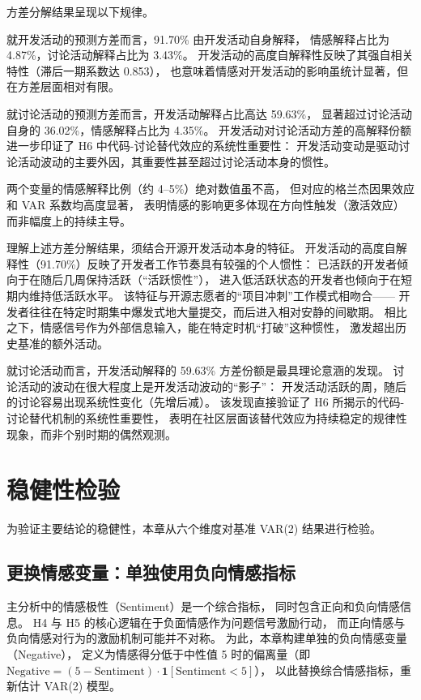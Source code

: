 \documentclass[
    type = master, %
    degree = professional,        %
    decl-page,  %
    twoside,                %
    fontset = fandol %
  ]{njuthesis}
\begin{document}
方差分解结果呈现以下规律。

就开发活动的预测方差而言，91.70\% 由开发活动自身解释，
情感解释占比为 4.87\%，讨论活动解释占比为 3.43\%。
开发活动的高度自解释性反映了其强自相关特性（滞后一期系数达 0.853），
也意味着情感对开发活动的影响虽统计显著，但在方差层面相对有限。

就讨论活动的预测方差而言，开发活动解释占比高达 59.63\%，
显著超过讨论活动自身的 36.02\%，情感解释占比为 4.35\%。
开发活动对讨论活动方差的高解释份额进一步印证了 H6 中代码-讨论替代效应的系统性重要性：
开发活动变动是驱动讨论活动波动的主要外因，其重要性甚至超过讨论活动本身的惯性。

两个变量的情感解释比例（约 4--5\%）绝对数值虽不高，
但对应的格兰杰因果效应和 VAR 系数均高度显著，
表明情感的影响更多体现在方向性触发（激活效应）而非幅度上的持续主导。

理解上述方差分解结果，须结合开源开发活动本身的特征。
开发活动的高度自解释性（91.70\%）反映了开发者工作节奏具有较强的个人惯性：
已活跃的开发者倾向于在随后几周保持活跃（“活跃惯性”），
进入低活跃状态的开发者也倾向于在短期内维持低活跃水平。
该特征与开源志愿者的“项目冲刺”工作模式相吻合——
开发者往往在特定时期集中爆发式地大量提交，而后进入相对安静的间歇期。
相比之下，情感信号作为外部信息输入，能在特定时机“打破”这种惯性，
激发超出历史基准的额外活动。

就讨论活动而言，开发活动解释的 59.63\% 方差份额是最具理论意涵的发现。
讨论活动的波动在很大程度上是开发活动波动的“影子”：
开发活动活跃的周，随后的讨论容易出现系统性变化（先增后减）。
该发现直接验证了 H6 所揭示的代码-讨论替代机制的系统性重要性，
表明在社区层面该替代效应为持续稳定的规律性现象，而非个别时期的偶然观测。


\section{稳健性检验}
\label{sec:robust-2}

为验证主要结论的稳健性，本章从六个维度对基准 VAR(2) 结果进行检验。

\subsection{更换情感变量：单独使用负向情感指标}

主分析中的情感极性（Sentiment）是一个综合指标，
同时包含正向和负向情感信息。
H4 与 H5 的核心逻辑在于负面情感作为问题信号激励行动，
而正向情感与负向情感对行为的激励机制可能并不对称。
为此，本章构建单独的负向情感变量（Negative），
定义为情感得分低于中性值 5 时的偏离量（即 $\text{Negative} = (5 - \text{Sentiment}) \cdot \mathbf{1}[\text{Sentiment} < 5]$），
以此替换综合情感指标，重新估计 VAR(2) 模型。
\end{document}
